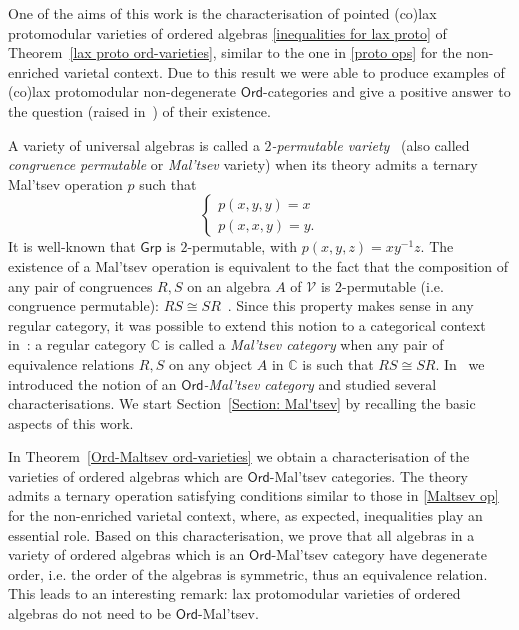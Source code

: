 \documentclass[11pt]{amsart}
\theoremstyle{plain}
\theoremstyle{definition}
\theoremstyle{remark}
\newcommand{\C}{\ensuremath{\mathbb{C}}}
\newcommand{\V}{\ensuremath{\mathcal{V}}}
\newcommand{\Grp}{\ensuremath{\mathsf{Grp}}}
\newcommand{\Ord}{\ensuremath{\mathsf{Ord}}}
\begin{document}
One of the aims of this work is the characterisation of pointed (co)lax protomodular varieties of ordered algebras \eqref{inequalities for lax proto} of Theorem~\ref{lax proto ord-varieties}, similar to the one in \eqref{proto ops} for the non-enriched varietal context.
Due to this result we were able to produce examples of (co)lax protomodular non-degenerate $\Ord$-categories and give a positive answer to the question (raised in~\cite{CMR}) of their existence.

A variety of universal algebras is called a \emph{$2$-permutable variety}~\cite{Smith} (also called \emph{congruence permutable} or \emph{Mal'tsev} variety) when its theory admits a ternary Mal'tsev operation $p$ such that
\begin{equation}\label{Maltsev op}
	\left\{\begin{array}{l} p(x,y,y)=x \\ p(x,x,y)=y .
	\end{array}\right.
\end{equation}
It is well-known that $\Grp$ is $2$-permutable, with $p(x,y,z)=xy^{-1}z$. The existence of a Mal'tsev operation is equivalent to the fact that the composition of any pair of congruences $R,S$ on an algebra $A$ of $\V$ is $2$-permutable (i.e. congruence permutable): $RS\cong SR$~\cite{Maltsev-Sbornik}. Since this property makes sense in any regular category, it was possible to extend this notion to a categorical context in~\cite{CLP}: a regular category $\C$ is called a \emph{Mal'tsev category} when any pair of equivalence relations $R, S$  on any object $A$ in $\C$ is such that $RS\cong SR$. In~\cite{CR} we introduced the notion of an \emph{$\Ord$-Mal'tsev category} and studied several characterisations. We start Section~\ref{Section: Mal'tsev} by recalling the basic aspects of this work.

In Theorem~\ref{Ord-Maltsev ord-varieties} we obtain a characterisation of the varieties of ordered algebras which are $\Ord$-Mal'tsev categories. The theory admits a ternary operation satisfying conditions similar to those in \eqref{Maltsev op} for the non-enriched varietal context, where, as expected, inequalities play an essential role. Based on this characterisation, we prove that all algebras in a variety of ordered algebras which is an $\Ord$-Mal'tsev category have degenerate order, i.e. the order of the algebras is symmetric, thus an equivalence relation. This leads to an interesting remark: 
lax protomodular varieties of ordered algebras do not need to be $\Ord$-Mal'tsev.
\end{document}
